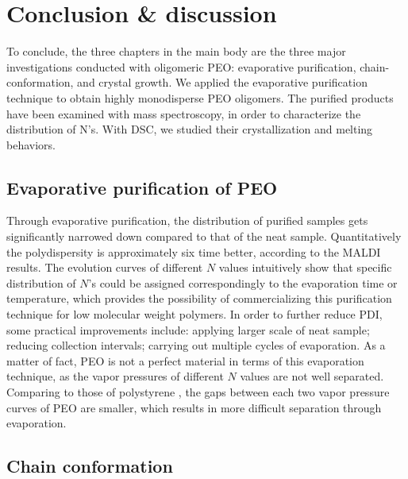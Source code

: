 \chapter{Conclusion \& discussion}

To conclude, the three chapters in the main body are the three major investigations conducted with oligomeric PEO: evaporative purification, chain-conformation, and crystal growth. We applied the evaporative purification technique to obtain highly monodisperse PEO oligomers. The purified products have been examined with mass spectroscopy, in order to characterize the distribution of N’s. With DSC, we studied their crystallization and melting behaviors.

\section{Evaporative purification of PEO}

Through evaporative purification, the distribution of purified samples gets significantly narrowed down compared to that of the neat sample. Quantitatively the polydispersity is approximately six time better, according to the MALDI results. The evolution curves of different $N$ values intuitively show that specific distribution of $N$’s could be assigned correspondingly to the evaporation time or temperature, which provides the possibility of commercializing this purification technique for low molecular weight polymers. In order to further reduce PDI, some practical improvements include: applying larger scale of neat sample; reducing collection intervals; carrying out multiple cycles of evaporation. As a matter of fact, PEO is not a perfect material in terms of this evaporation technique, as the vapor pressures of different $N$ values are not well separated. Comparing to those of polystyrene \cite{Zhu2017a}, the gaps between each two vapor pressure curves of PEO are smaller, which results in more difficult separation through evaporation.

\section{Chain conformation}

